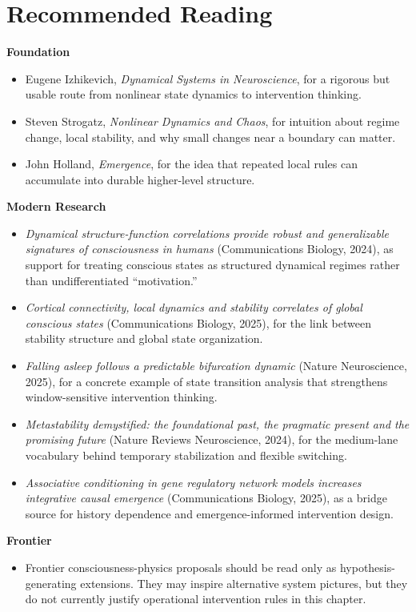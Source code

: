 \section{Recommended Reading}

\begin{readingbox}
\textbf{Foundation}
\begin{itemize}[nosep]
  \item Eugene Izhikevich, \emph{Dynamical Systems in Neuroscience}, for a
        rigorous but usable route from nonlinear state dynamics to intervention
        thinking.
  \item Steven Strogatz, \emph{Nonlinear Dynamics and Chaos}, for intuition
        about regime change, local stability, and why small changes near a
        boundary can matter.
  \item John Holland, \emph{Emergence}, for the idea that repeated local rules
        can accumulate into durable higher-level structure.
\end{itemize}
\textbf{Modern Research}
\begin{itemize}[nosep]
  \item \emph{Dynamical structure-function correlations provide robust and
        generalizable signatures of consciousness in humans} (Communications
        Biology, 2024), as support for treating conscious states as structured
        dynamical regimes rather than undifferentiated ``motivation.''
  \item \emph{Cortical connectivity, local dynamics and stability correlates of
        global conscious states} (Communications Biology, 2025), for the link
        between stability structure and global state organization.
  \item \emph{Falling asleep follows a predictable bifurcation dynamic}
        (Nature Neuroscience, 2025), for a concrete example of state transition
        analysis that strengthens window-sensitive intervention thinking.
  \item \emph{Metastability demystified: the foundational past, the pragmatic
        present and the promising future} (Nature Reviews Neuroscience, 2024),
        for the medium-lane vocabulary behind temporary stabilization and
        flexible switching.
  \item \emph{Associative conditioning in gene regulatory network models
        increases integrative causal emergence} (Communications Biology, 2025),
        as a bridge source for history dependence and emergence-informed
        intervention design.
\end{itemize}
\textbf{Frontier}
\begin{itemize}[nosep]
  \item Frontier consciousness-physics proposals should be read only as
        hypothesis-generating extensions. They may inspire alternative system
        pictures, but they do not currently justify operational intervention
        rules in this chapter.
\end{itemize}
\end{readingbox}


